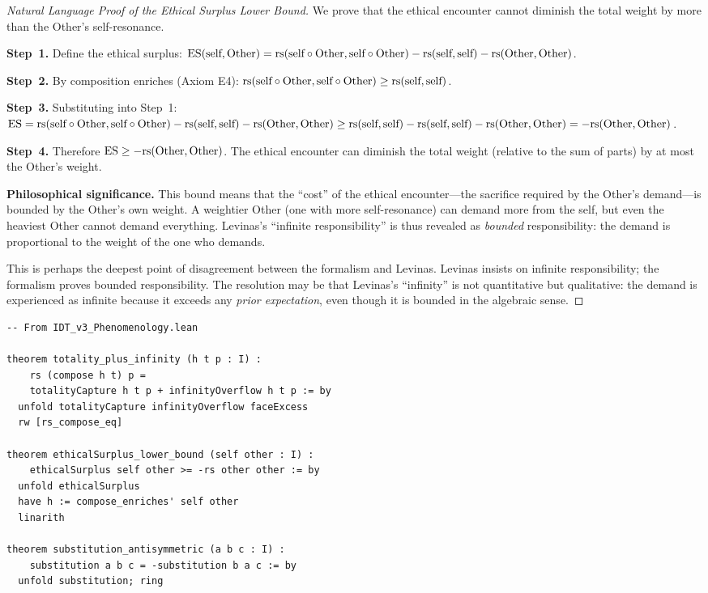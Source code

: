 \begin{proof}[Natural Language Proof of the Ethical Surplus Lower Bound]
We prove that the ethical encounter cannot diminish the total weight by
more than the Other's self-resonance.

\textbf{Step~1.} Define the ethical surplus:
$\mathrm{ES}(\text{self}, \text{Other}) = \mathrm{rs}(\text{self} \circ \text{Other},
\text{self} \circ \text{Other}) - \mathrm{rs}(\text{self}, \text{self})
- \mathrm{rs}(\text{Other}, \text{Other})$.

\textbf{Step~2.} By composition enriches (Axiom E4):
$\mathrm{rs}(\text{self} \circ \text{Other}, \text{self} \circ \text{Other})
\geq \mathrm{rs}(\text{self}, \text{self})$.

\textbf{Step~3.} Substituting into Step~1:
$\mathrm{ES} = \mathrm{rs}(\text{self} \circ \text{Other}, \text{self} \circ
\text{Other}) - \mathrm{rs}(\text{self}, \text{self}) - \mathrm{rs}(\text{Other}, \text{Other})
\geq \mathrm{rs}(\text{self}, \text{self}) - \mathrm{rs}(\text{self}, \text{self})
- \mathrm{rs}(\text{Other}, \text{Other}) = -\mathrm{rs}(\text{Other}, \text{Other})$.

\textbf{Step~4.} Therefore $\mathrm{ES} \geq -\mathrm{rs}(\text{Other}, \text{Other})$.
The ethical encounter can diminish the total weight (relative to the sum of
parts) by at most the Other's weight.

\textbf{Philosophical significance.} This bound means that the ``cost'' of
the ethical encounter---the sacrifice required by the Other's demand---is
bounded by the Other's own weight. A weightier Other (one with more
self-resonance) can demand more from the self, but even the heaviest Other
cannot demand everything. Levinas's ``infinite responsibility'' is thus
revealed as \emph{bounded} responsibility: the demand is proportional to
the weight of the one who demands.

This is perhaps the deepest point of disagreement between the formalism and
Levinas. Levinas insists on infinite responsibility; the formalism proves
bounded responsibility. The resolution may be that Levinas's ``infinity''
is not quantitative but qualitative: the demand is experienced as infinite
because it exceeds any \emph{prior expectation}, even though it is bounded
in the algebraic sense.
\end{proof}

\begin{lstlisting}
-- From IDT_v3_Phenomenology.lean

theorem totality_plus_infinity (h t p : I) :
    rs (compose h t) p =
    totalityCapture h t p + infinityOverflow h t p := by
  unfold totalityCapture infinityOverflow faceExcess
  rw [rs_compose_eq]

theorem ethicalSurplus_lower_bound (self other : I) :
    ethicalSurplus self other >= -rs other other := by
  unfold ethicalSurplus
  have h := compose_enriches' self other
  linarith

theorem substitution_antisymmetric (a b c : I) :
    substitution a b c = -substitution b a c := by
  unfold substitution; ring
\end{lstlisting}

